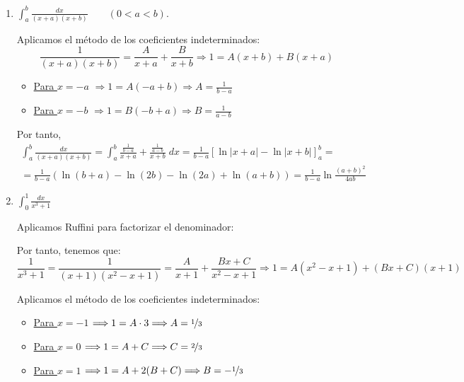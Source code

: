 \begin{ejercicio}
\begin{enumerate}
        \item $ \displaystyle \int_a^b \frac{dx}{(x+a)(x+b)} \qquad (0<a<b)$.

        Aplicamos el método de los coeficientes indeterminados:
        \begin{equation*}
            \frac{1}{(x+a)(x+b)} = \frac{A}{x+a}+\frac{B}{x+b} \Longrightarrow 1=A(x+b)+B(x+a)
        \end{equation*}

        \begin{itemize}
            \item \underline{Para $x=-a$} $\Longrightarrow 1=A(-a+b) \Longrightarrow A=\frac{1}{b-a}$
            \item \underline{Para $x=-b$} $\Longrightarrow 1=B(-b+a) \Longrightarrow B=\frac{1}{a-b}$
        \end{itemize}

        Por tanto,
        \begin{multline*}
            \int_a^b \frac{dx}{(x+a)(x+b)}
            = \int_a^b \frac{\frac{1}{b-a}}{x+a}+\frac{\frac{1}{a-b}}{x+b}\;dx
            = \frac{1}{b-a}\left[\ln |x+a|-\ln |x+b|\right]_a^b
            =\\= \frac{1}{b-a}\left(\ln(b+a)-\ln(2b)-\ln(2a)+\ln(a+b)\right)
            = \frac{1}{b-a}\ln \frac{(a+b)^2}{4ab}
        \end{multline*}

        \item $\displaystyle \int_0^1 \frac{dx}{x^3+1}$
        
        Aplicamos Ruffini para factorizar el denominador:
        \begin{figure}[H]
            \centering
        \end{figure}

        Por tanto, tenemos que:
        \begin{equation*}
            \frac{1}{x^3+1} = \frac{1}{(x+1)(x^2-x+1)} = \frac{A}{x+1}+\frac{Bx+C}{x^2-x+1}
            \Longrightarrow 1=A(x^2-x+1)+(Bx+C)(x+1)
        \end{equation*}

        Aplicamos el método de los coeficientes indeterminados:
        \begin{itemize}
            \item \underline{Para $x=-1$} $\Longrightarrow 1=A\cdot 3 \Longrightarrow A=\nicefrac{1}{3}$
            \item \underline{Para $x=0$} $\Longrightarrow 1=A + C \Longrightarrow C=\nicefrac{2}{3}$
            \item \underline{Para $x=1$} $\Longrightarrow 1=A + 2(B+C) \Longrightarrow B=-\nicefrac{1}{3}$
        \end{itemize}


\end{enumerate}
\end{ejercicio}
